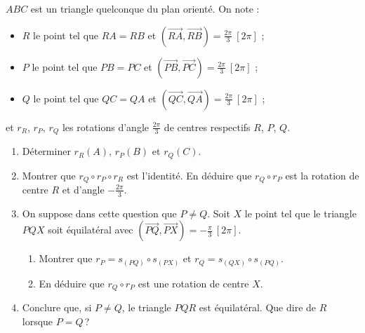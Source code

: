\begin{exo}\label{exo:isom-napoleon}
      $ABC$ est un triangle quelconque du plan orienté. On note :
      \begin{itemize}
            \item $R$ le point tel que $RA = RB$ et $(\overrightarrow{RA},\overrightarrow{RB}) = \frac{2\pi}{3}\ [2\pi]$ ;
            \item $P$ le point tel que $PB = PC$ et $(\overrightarrow{PB},\overrightarrow{PC}) = \frac{2\pi}{3}\ [2\pi]$ ;
            \item $Q$ le point tel que $QC = QA$ et $(\overrightarrow{QC},\overrightarrow{QA}) = \frac{2\pi}{3}\ [2\pi]$ ;
      \end{itemize}
      et $r_R$, $r_P$, $r_Q$ les rotations d'angle $\frac{2\pi}{3}$ de centres respectifs $R$, $P$, $Q$.
      \begin{enumerate}
            \item Déterminer $r_R(A)$, $r_P(B)$ et $r_Q(C)$.
            \item Montrer que $r_Q \circ r_P \circ r_R$ est l'identité.
                  En déduire que $r_Q \circ r_P$ est la rotation de centre $R$ et d'angle $-\frac{2\pi}{3}$.
            \item On suppose dans cette question que $P \neq Q$.
                  Soit $X$ le point tel que le triangle $PQX$ soit équilatéral avec $(\overrightarrow{PQ},\overrightarrow{PX}) = -\frac{\pi}{3}\ [2\pi]$.
                  \begin{enumerate}
                        \item Montrer que $r_P = s_{(PQ)} \circ s_{(PX)}$ et $r_Q = s_{(QX)} \circ s_{(PQ)}$.
                        \item En déduire que $r_Q \circ r_P$ est une rotation de centre $X$.
                  \end{enumerate}
            \item Conclure que, si $P \neq Q$, le triangle $PQR$ est équilatéral.
                  Que dire de $R$ lorsque $P = Q$\,?
      \end{enumerate}
\end{exo}

